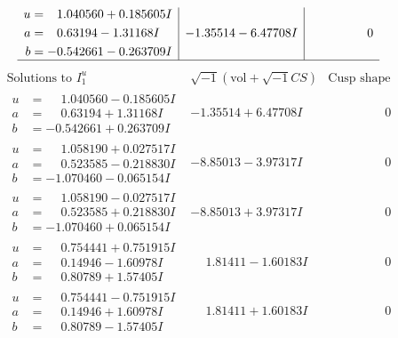 \documentclass[1p]{elsarticle_modified}
\theoremstyle{definition}
\newcommand{\I}{\sqrt{-1}}
\begin{document}
$$\begin{array}{c|c|c}
\begin{aligned}
u &= \phantom{-}1.040560 + 0.185605 I \\
a &= \phantom{-}0.63194 - 1.31168 I \\
b &= -0.542661 - 0.263709 I\end{aligned}
 & -1.35514 - 6.47708 I & \phantom{-0.000000 } 0\\
 \hline 
 \end{array}$$\newpage$$\begin{array}{c|c|c}  
\text{Solutions to }I^u_{1}& \I (\text{vol} + \sqrt{-1}CS) & \text{Cusp shape}\\
 \hline 
\begin{aligned}
u &= \phantom{-}1.040560 - 0.185605 I \\
a &= \phantom{-}0.63194 + 1.31168 I \\
b &= -0.542661 + 0.263709 I\end{aligned}
 & -1.35514 + 6.47708 I & \phantom{-0.000000 } 0 \\ \hline\begin{aligned}
u &= \phantom{-}1.058190 + 0.027517 I \\
a &= \phantom{-}0.523585 - 0.218830 I \\
b &= -1.070460 - 0.065154 I\end{aligned}
 & -8.85013 - 3.97317 I & \phantom{-0.000000 } 0 \\ \hline\begin{aligned}
u &= \phantom{-}1.058190 - 0.027517 I \\
a &= \phantom{-}0.523585 + 0.218830 I \\
b &= -1.070460 + 0.065154 I\end{aligned}
 & -8.85013 + 3.97317 I & \phantom{-0.000000 } 0 \\ \hline\begin{aligned}
u &= \phantom{-}0.754441 + 0.751915 I \\
a &= \phantom{-}0.14946 - 1.60978 I \\
b &= \phantom{-}0.80789 + 1.57405 I\end{aligned}
 & \phantom{-}1.81411 - 1.60183 I & \phantom{-0.000000 } 0 \\ \hline\begin{aligned}
u &= \phantom{-}0.754441 - 0.751915 I \\
a &= \phantom{-}0.14946 + 1.60978 I \\
b &= \phantom{-}0.80789 - 1.57405 I\end{aligned}
 & \phantom{-}1.81411 + 1.60183 I & \phantom{-0.000000 } 0 \\ \hline\begin{aligned}

\end{aligned}
\end{array}$$
\end{document}
